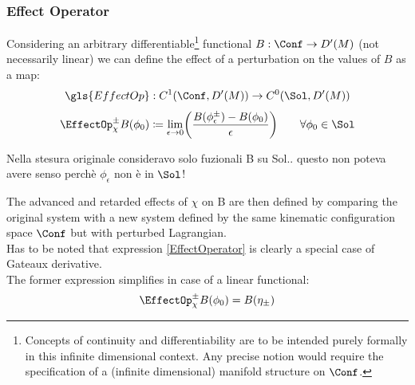 \documentclass[Main]{subfiles}
\begin{document}
			
   		
		\subsubsection{Effect Operator}
		Considering an arbitrary differentiable\footnote{Concepts of continuity and differentiability are to be intended purely formally  in this infinite dimensional context.
		Any precise notion would require the specification of a (infinite dimensional) manifold structure on $\Conf$.} functional $B: \Conf \rightarrow D'(M)$ (not necessarily linear) we can define the effect of a perturbation on the values of $B$\cite[pag. 5]{Marolf1993} as a map:
		\begin{displaymath}
			\gls{EffectOp} : C^1(\Conf,D'(M)) \rightarrow C^0(\Sol,D'(M))
		\end{displaymath}
		\begin{equation}\label{EffectOperator}
		\EffectOp_\chi^\pm B ( \phi_0) 
		\coloneqq \lim_{\epsilon \rightarrow 0}
		 \biggr( \frac{B(\phi_\epsilon^\pm) - B (\phi_0)}{\epsilon} \biggr)
		 \qquad \forall \phi_0 \in \Sol
		\end{equation}
\ifToninus
	\begin{Warning}
		Nella stesura originale consideravo solo fuzionali B su Sol..  questo non poteva avere senso perchè $\phi_\epsilon$ non è in $\Sol$!
	\end{Warning}
\fi
		The advanced and retarded effects of $\chi$ on B are then defined by comparing the original system with a new system defined by the same kinematic configuration space $\Conf$ but with perturbed Lagrangian.
		\\
			Has to be noted that expression \ref{EffectOperator} is clearly a special case of Gateaux derivative.\cite{Blanchard2015}
		\\		
		The former expression simplifies in case of a linear functional:
			\begin{equation}\label{EffectOperatorLinear}
				\EffectOp_\chi^\pm B ( \phi_0) =  B(\eta_\pm)
			\end{equation}
		
\end{document}
